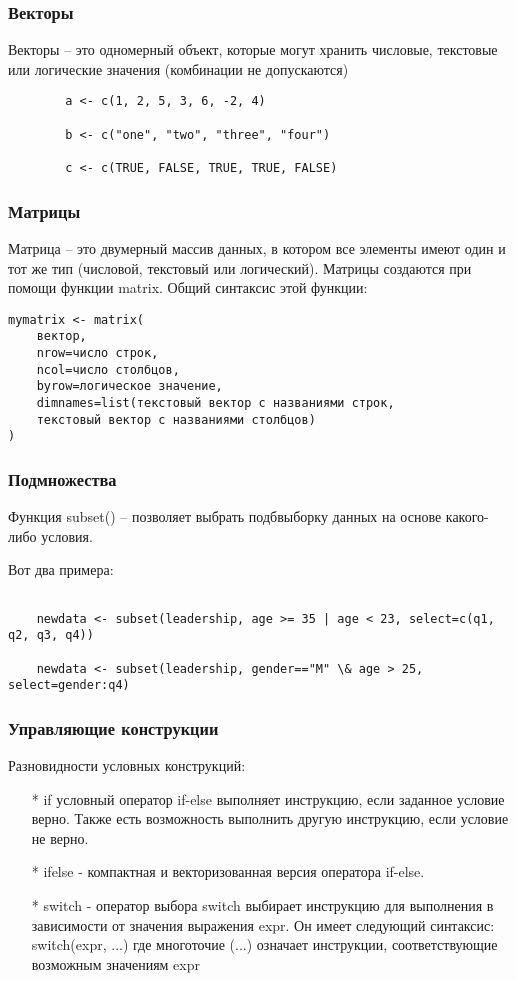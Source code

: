 \documentclass{beamer}
\begin{document}
\begin{frame}[fragile]
	\frametitle{Векторы}
	Векторы – это одномерный объект, которые могут хранить числовые, текстовые или логические значения (комбинации не допускаются)
	\begin{verbatim}
		a <- c(1, 2, 5, 3, 6, -2, 4)
		
		b <- c("one", "two", "three", "four")
		
		c <- c(TRUE, FALSE, TRUE, TRUE, FALSE)
	\end{verbatim}
\end{frame}

\begin{frame}[fragile]
	\frametitle{Матрицы}
Матрица – это двумерный массив данных, в котором все элементы имеют один и тот же тип (числовой, текстовый или логический). Матрицы создаются при помощи функции matrix. Общий синтаксис этой функции:
\begin{verbatim}
mymatrix <- matrix(
    вектор, 
    nrow=число строк, 
    ncol=число столбцов, 
    byrow=логическое значение, 
    dimnames=list(текстовый вектор с названиями строк, 
    текстовый вектор с названиями столбцов)
)
\end{verbatim}


\end{frame}

\begin{frame}[fragile]
	\frametitle{Подмножества}
	Функция subset() – позволяет выбрать подбвыборку данных на основе какого-либо условия. 
	
	Вот два примера:
	{\fontsize{8}{9}\selectfont
\begin{verbatim}
		
	newdata <- subset(leadership, age >= 35 | age < 23, select=c(q1, q2, q3, q4))
	            
	newdata <- subset(leadership, gender=="M" \& age > 25, select=gender:q4)
\end{verbatim}}	
\end{frame}

\begin{frame}
	\frametitle{Управляющие конструкции}
	Разновидности условных конструкций:
	\begin{itemize}
	\item[*]if условный оператор if-else выполняет инструкцию, если заданное условие верно. Также есть возможность выполнить другую инструкцию, если условие не верно.
	
	\item[*]ifelse - компактная и векторизованная версия оператора if-else.
	
	\item[*]switch - оператор выбора switch выбирает инструкцию для выполнения в зависимости от значения выражения expr. Он имеет следующий синтаксис: switch(expr, ...) где многоточие (...) означает инструкции, соответствующие возможным значениям expr
	\end{itemize}
\end{frame}	
\end{document}
